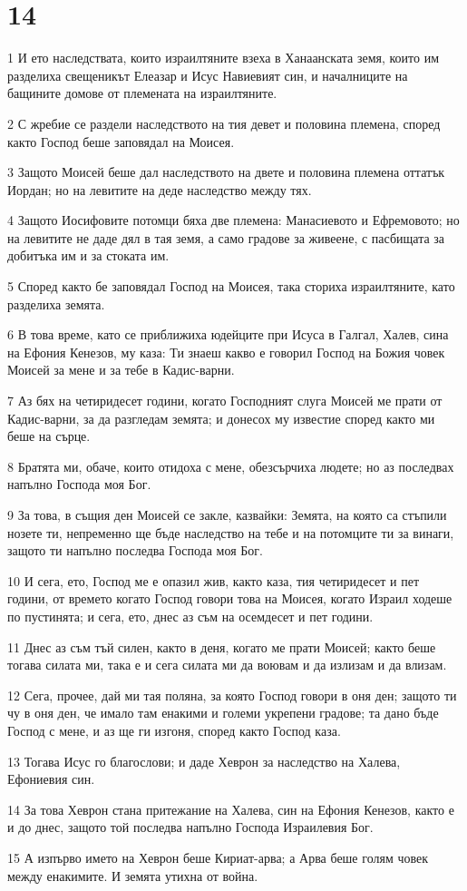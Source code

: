 \chapter{14}

\par 1 И ето наследствата, които израилтяните взеха в Ханаанската земя, които им разделиха свещеникът Елеазар и Исус Навиевият син, и началниците на бащините домове от племената на израилтяните.
\par 2 С жребие се раздели наследството на тия девет и половина племена, според както Господ беше заповядал на Моисея.
\par 3 Защото Моисей беше дал наследството на двете и половина племена оттатък Иордан; но на левитите на деде наследство между тях.
\par 4 Защото Иосифовите потомци бяха две племена: Манасиевото и Ефремовото; но на левитите не даде дял в тая земя, а само градове за живеене, с пасбищата за добитъка им и за стоката им.
\par 5 Според както бе заповядал Господ на Моисея, така сториха израилтяните, като разделиха земята.
\par 6 В това време, като се приближиха юдейците при Исуса в Галгал, Халев, сина на Ефония Кенезов, му каза: Ти знаеш какво е говорил Господ на Божия човек Моисей за мене и за тебе в Кадис-варни.
\par 7 Аз бях на четиридесет години, когато Господният слуга Моисей ме прати от Кадис-варни, за да разгледам земята; и донесох му известие според както ми беше на сърце.
\par 8 Братята ми, обаче, които отидоха с мене, обезсърчиха людете; но аз последвах напълно Господа моя Бог.
\par 9 За това, в същия ден Моисей се закле, казвайки: Земята, на която са стъпили нозете ти, непременно ще бъде наследство на тебе и на потомците ти за винаги, защото ти напълно последва Господа моя Бог.
\par 10 И сега, ето, Господ ме е опазил жив, както каза, тия четиридесет и пет години, от времето когато Господ говори това на Моисея, когато Израил ходеше по пустинята; и сега, ето, днес аз съм на осемдесет и пет години.
\par 11 Днес аз съм тъй силен, както в деня, когато ме прати Моисей; както беше тогава силата ми, така е и сега силата ми да воювам и да излизам и да влизам.
\par 12 Сега, прочее, дай ми тая поляна, за която Господ говори в оня ден; защото ти чу в оня ден, че имало там енакими и големи укрепени градове; та дано бъде Господ с мене, и аз ще ги изгоня, според както Господ каза.
\par 13 Тогава Исус го благослови; и даде Хеврон за наследство на Халева, Ефониевия син.
\par 14 За това Хеврон стана притежание на Халева, син на Ефония Кенезов, както е и до днес, защото той последва напълно Господа Израилевия Бог.
\par 15 А изпърво името на Хеврон беше Кириат-арва; а Арва беше голям човек между енакимите. И земята утихна от война.

